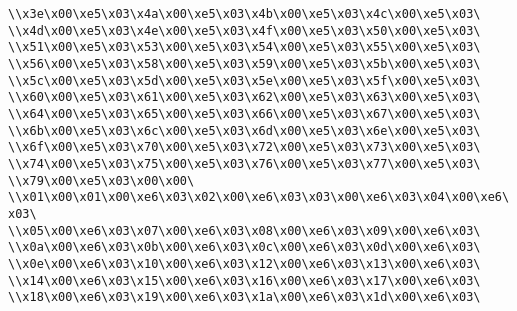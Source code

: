 \verb|\\x3e\x00\xe5\x03\x4a\x00\xe5\x03\x4b\x00\xe5\x03\x4c\x00\xe5\x03\|\newline
\verb|\\x4d\x00\xe5\x03\x4e\x00\xe5\x03\x4f\x00\xe5\x03\x50\x00\xe5\x03\|\newline
\verb|\\x51\x00\xe5\x03\x53\x00\xe5\x03\x54\x00\xe5\x03\x55\x00\xe5\x03\|\newline
\verb|\\x56\x00\xe5\x03\x58\x00\xe5\x03\x59\x00\xe5\x03\x5b\x00\xe5\x03\|\newline
\verb|\\x5c\x00\xe5\x03\x5d\x00\xe5\x03\x5e\x00\xe5\x03\x5f\x00\xe5\x03\|\newline
\verb|\\x60\x00\xe5\x03\x61\x00\xe5\x03\x62\x00\xe5\x03\x63\x00\xe5\x03\|\newline
\verb|\\x64\x00\xe5\x03\x65\x00\xe5\x03\x66\x00\xe5\x03\x67\x00\xe5\x03\|\newline
\verb|\\x6b\x00\xe5\x03\x6c\x00\xe5\x03\x6d\x00\xe5\x03\x6e\x00\xe5\x03\|\newline
\verb|\\x6f\x00\xe5\x03\x70\x00\xe5\x03\x72\x00\xe5\x03\x73\x00\xe5\x03\|\newline
\verb|\\x74\x00\xe5\x03\x75\x00\xe5\x03\x76\x00\xe5\x03\x77\x00\xe5\x03\|\newline
\verb|\\x79\x00\xe5\x03\x00\x00\|\newline
\verb|\\x01\x00\x01\x00\xe6\x03\x02\x00\xe6\x03\x03\x00\xe6\x03\x04\x00\xe6\x03\|\newline
\verb|\\x05\x00\xe6\x03\x07\x00\xe6\x03\x08\x00\xe6\x03\x09\x00\xe6\x03\|\newline
\verb|\\x0a\x00\xe6\x03\x0b\x00\xe6\x03\x0c\x00\xe6\x03\x0d\x00\xe6\x03\|\newline
\verb|\\x0e\x00\xe6\x03\x10\x00\xe6\x03\x12\x00\xe6\x03\x13\x00\xe6\x03\|\newline
\verb|\\x14\x00\xe6\x03\x15\x00\xe6\x03\x16\x00\xe6\x03\x17\x00\xe6\x03\|\newline
\verb|\\x18\x00\xe6\x03\x19\x00\xe6\x03\x1a\x00\xe6\x03\x1d\x00\xe6\x03\|\newline
